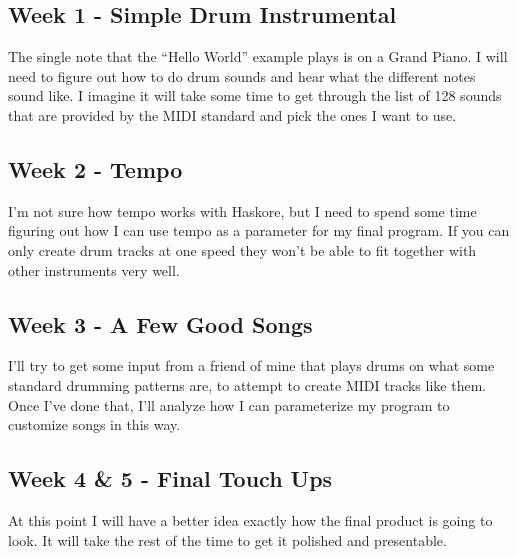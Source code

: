 \documentclass{article}
\begin{document}
\subsection*{Week 1 - Simple Drum Instrumental}
The single note that the ``Hello World'' example plays is on a Grand Piano. I will need to
figure out how to do drum sounds and hear what the different notes sound like. I imagine
it will take some time to get through the list of 128 sounds that are provided by the MIDI
standard and pick the ones I want to use.
\subsection*{Week 2 - Tempo}
I'm not sure how tempo works with Haskore, but I need to spend some time figuring out how I
can use tempo as a parameter for my final program. If you can only create drum tracks at one
speed they won't be able to fit together with other instruments very well.
\subsection*{Week 3 - A Few Good Songs}
I'll try to get some input from a friend of mine that plays drums on what some standard
drumming patterns are, to attempt to create MIDI tracks like them. Once I've done that, I'll analyze
how I can parameterize my program to customize songs in this way.
\subsection*{Week 4 \& 5 - Final Touch Ups}
At this point I will have a better idea exactly how the final product is going to look.
It will take the rest of the time to get it polished and presentable.
\end{document}
